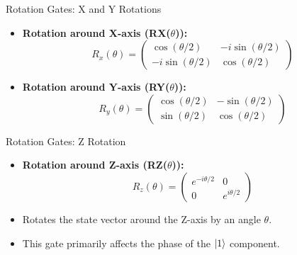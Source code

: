 \documentclass{beamer}
\begin{document}
\begin{frame}[fragile]{Rotation Gates: X and Y Rotations}
    \begin{itemize}
        \item \textbf{Rotation around X-axis (RX($\theta$)):}
        \[ R_x(\theta) = \begin{pmatrix} \cos(\theta/2) & -i\sin(\theta/2) \\ -i\sin(\theta/2) & \cos(\theta/2) \end{pmatrix} \]
        
        \item \textbf{Rotation around Y-axis (RY($\theta$)):}
        \[ R_y(\theta) = \begin{pmatrix} \cos(\theta/2) & -\sin(\theta/2) \\ \sin(\theta/2) & \cos(\theta/2) \end{pmatrix} \]
    \end{itemize}
\end{frame}

\begin{frame}[fragile]{Rotation Gates: Z Rotation}
    \begin{itemize}
        \item \textbf{Rotation around Z-axis (RZ($\theta$)):}
        \[ R_z(\theta) = \begin{pmatrix} e^{-i\theta/2} & 0 \\ 0 & e^{i\theta/2} \end{pmatrix} \]
        
        \item Rotates the state vector around the Z-axis by an angle $\theta$.
        \item This gate primarily affects the phase of the $\ket{1}$ component.
    \end{itemize}
\end{frame}
\end{document}
